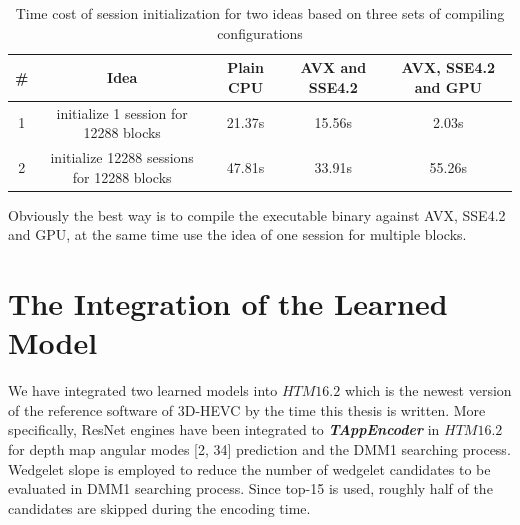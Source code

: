 \begin{table}
    \caption{Time cost of session initialization for two ideas based on three sets of compiling configurations}
    \bigskip\label{tab:seesion-init-plain-cpu}
    \centering
    \begin{tabular}{c c c c c}
        \toprule
        \# & Idea & Plain CPU & AVX and SSE4.2 & AVX, SSE4.2 and GPU \\
        \midrule
        1 & initialize 1 session for 12288 blocks & 21.37s &15.56s&2.03s \\
        2 & initialize 12288 sessions for 12288 blocks & 47.81s &33.91s&55.26s\\
        \bottomrule
    \end{tabular}
\end{table}

Obviously the best way is to compile the 
executable binary against AVX, SSE4.2 and GPU, at the same
time use the idea of one session for multiple blocks.

\section{The Integration of the Learned Model}\label{sec:integration-of-learned-model}
We have integrated two learned models into 
\(HTM16.2\) which is the newest version of
the reference software of 3D-HEVC by the time this thesis
is written\@.
More specifically, ResNet engines have been integrated to 
\textbf{\textit{TAppEncoder}} in \(HTM16.2\) for depth map 
angular modes [2, 34] prediction and the DMM1 searching process.
Wedgelet slope is employed
to reduce the number of wedgelet candidates to be evaluated in DMM1 
searching process. 
Since top-15 is used, roughly half of the candidates are skipped
during the encoding time.

